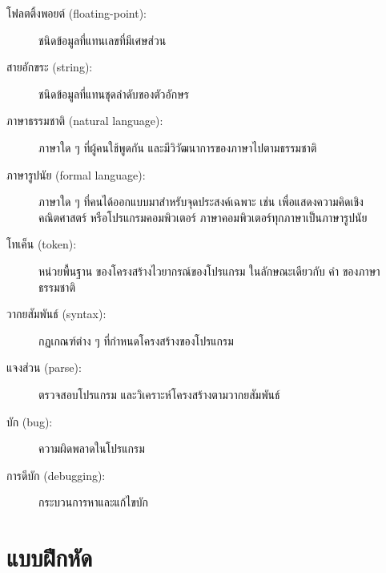 \begin{description}
\item[โฟลตติ้งพอยต์ (floating-point):] ชนิดข้อมูลที่แทนเลขที่มีเศษส่วน

\item[สายอักขระ (string):] ชนิดข้อมูลที่แทนชุดลำดับของตัวอักษร

\item[ภาษาธรรมชาติ (natural language):]  
ภาษาใด ๆ ที่ผู้คนใช้พูดกัน และมีวิวัฒนาการของภาษาไปตามธรรมชาติ

\item[ภาษารูปนัย (formal language):]  
ภาษาใด ๆ ที่คนได้ออกแบบมาสำหรับจุดประสงค์เฉพาะ 
เช่น เพื่อแสดงความคิดเชิงคณิตศาสตร์ หรือโปรแกรมคอมพิวเตอร์
ภาษาคอมพิวเตอร์ทุกภาษาเป็นภาษารูปนัย

\item[โทเค็น (token):] 
หน่วยพื้นฐาน ของโครงสร้างไวยากรณ์ของโปรแกรม 
ในลักษณะเดียวกับ คำ ของภาษาธรรมชาติ

\item[วากยสัมพันธ์ (syntax):] กฏเกณฑ์ต่าง ๆ ที่กำหนดโครงสร้างของโปรแกรม

\item[แจงส่วน (parse):] 
ตรวจสอบโปรแกรม และวิเคราะห์โครงสร้างตามวากยสัมพันธ์

\item[บัก (bug):] 
ความผิดพลาดในโปรแกรม

\item[การดีบัก (debugging):] 
กระบวนการหาและแก้ไขบัก

\end{description}


\section{แบบฝึกหัด}

